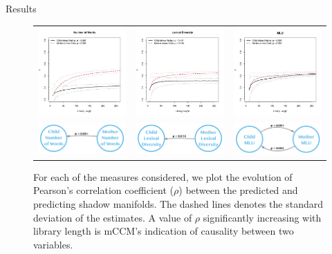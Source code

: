 \documentclass[final]{beamer}
\begin{document}
\begin{frame}{}
\begin{textblock}{34}
\begin{block}{Results}
\begin{figure}
\begin{tabular}{ccc}
\includegraphics[width=.32\textwidth]{N_Words_Cause.jpg} &
\includegraphics[width=.32\textwidth]{Lexical_Cause.jpg} &
\includegraphics[width=.32\textwidth]{Syntactic_Cause.jpg} \\
\includegraphics[width=.32\textwidth]{loq_results.jpg} & 
\includegraphics[width=.32\textwidth]{lex_results.jpg} &
\includegraphics[width=.32\textwidth]{mlu_results.jpg}
\end{tabular}
\caption{For each of the measures considered, we plot the evolution of Pearson’s correlation coefficient ($\rho$) between the predicted and predicting shadow manifolds. The dashed lines denotes the standard deviation of the estimates. A value of $\rho$ significantly increasing with library length is mCCM’s indication of causality between two variables.}
\label{fig:results}
\end{figure}


\end{block}
\end{textblock}
\end{frame}
\end{document}
